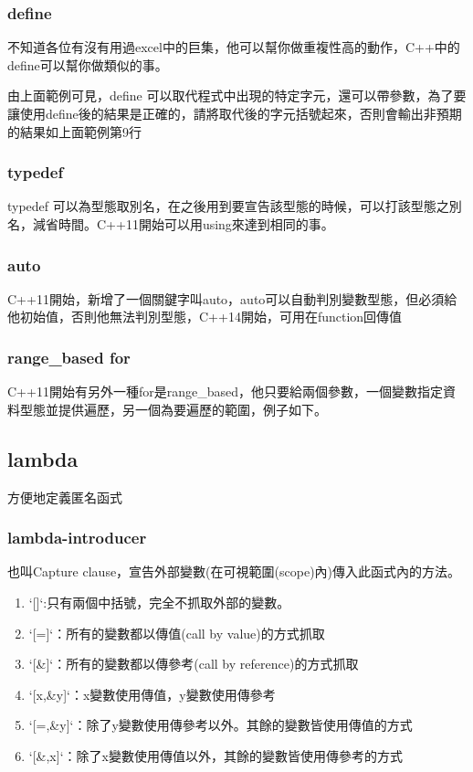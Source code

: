 \subsubsection{define}
不知道各位有沒有用過excel中的巨集，他可以幫你做重複性高的動作，C++中的define可以幫你做類似的事。

由上面範例可見，define 可以取代程式中出現的特定字元，還可以帶參數，為了要讓使用define後的結果是正確的，請將取代後的字元括號起來，否則會輸出非預期的結果如上面範例第9行

\subsubsection{typedef}
typedef 可以為型態取別名，在之後用到要宣告該型態的時候，可以打該型態之別名，減省時間。C++11開始可以用using來達到相同的事。

\subsubsection{auto}
C++11開始，新增了一個關鍵字叫auto，auto可以自動判別變數型態，但必須給他初始值，否則他無法判別型態，C++14開始，可用在function回傳值

\subsubsection{range\_based for}
C++11開始有另外一種for是range\_based，他只要給兩個參數，一個變數指定資料型態並提供遍歷，另一個為要遍歷的範圍，例子如下。

\subsection{lambda}
方便地定義匿名函式
\subsubsection{lambda-introducer}
也叫Capture clause，宣告外部變數(在可視範圍(scope)內)傳入此函式內的方法。
\begin{enumerate}
\item `[]`:只有兩個中括號，完全不抓取外部的變數。
\item `[=]`：所有的變數都以傳值(call by value)的方式抓取
\item `[\&]`：所有的變數都以傳參考(call by reference)的方式抓取
\item `[x,\&y]`：x變數使用傳值，y變數使用傳參考
\item `[=,\&y]`：除了y變數使用傳參考以外。其餘的變數皆使用傳值的方式
\item `[\&,x]`：除了x變數使用傳值以外，其餘的變數皆使用傳參考的方式
\end{enumerate}

